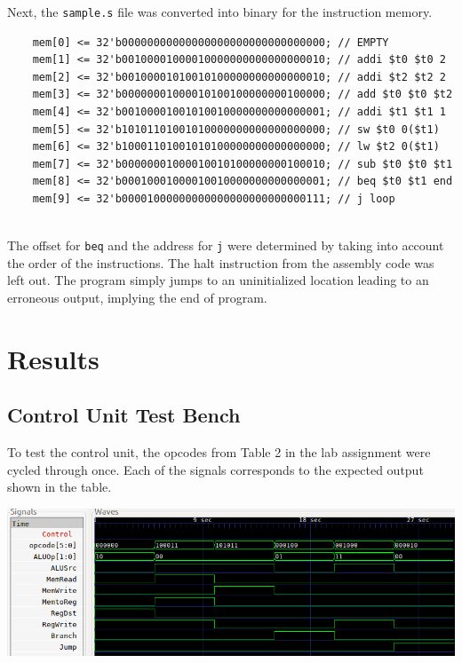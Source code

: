\documentclass[twocolumn]{article}
\newcommand{\cc}[1]{\texttt{#1}}
\begin{document}
Next, the \cc{sample.s} file was converted into binary for the instruction memory. 

\begin{lstlisting}
    mem[0] <= 32'b00000000000000000000000000000000; // EMPTY
    mem[1] <= 32'b00100001000010000000000000000010; // addi $t0 $t0 2
    mem[2] <= 32'b00100001010010100000000000000010; // addi $t2 $t2 2
    mem[3] <= 32'b00000001000010100100000000100000; // add $t0 $t0 $t2
    mem[4] <= 32'b00100001001010010000000000000001; // addi $t1 $t1 1
    mem[5] <= 32'b10101101001010000000000000000000; // sw $t0 0($t1)
    mem[6] <= 32'b10001101001010100000000000000000; // lw $t2 0($t1)
    mem[7] <= 32'b00000001000010010100000000100010; // sub $t0 $t0 $t1
    mem[8] <= 32'b00010001000010010000000000000001; // beq $t0 $t1 end
    mem[9] <= 32'b00001000000000000000000000000111; // j loop
\end{lstlisting}
\\

The offset for \cc{beq} and the address for \cc{j} were determined by taking into account the order of the instructions. The halt instruction from the assembly code was left out. The program simply jumps to an uninitialized location leading to an erroneous output, implying the end of program. 

\newpage

\section{Results}

\subsection{Control Unit Test Bench}

To test the control unit, the opcodes from Table 2 in the lab assignment were cycled through once. Each of the signals corresponds to the expected output shown in the table. 

\begingroup
    \centering
    \medskip
    \includegraphics[width=\columnwidth]{Lab-Tex/Lab5-images/t1.png}
    \medskip
\endgroup
\end{document}
